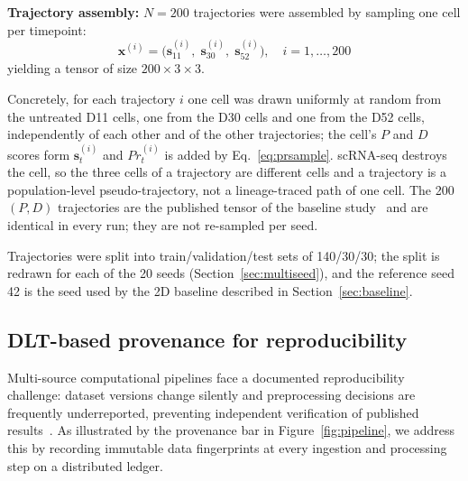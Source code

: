 \documentclass[5p,times,twocolumn]{elsarticle}
\newcommand{\rtag}[1]{}
\newcommand{\rev}[2]{\rtag{#1}#2}
\newenvironment{revblock}[1]{\par\rtag{#1}\ignorespaces}{\par}
\begin{document}
\textbf{Trajectory assembly:}
$N = 200$ trajectories were assembled by sampling one cell
per timepoint:
%
\begin{equation}
  \mathbf{x}^{(i)} =
    \bigl(\mathbf{s}^{(i)}_{11},\;
           \mathbf{s}^{(i)}_{30},\;
           \mathbf{s}^{(i)}_{52}\bigr),
  \quad i = 1,\ldots,200
  \label{eq:traj}
\end{equation}
%
yielding a tensor of size $200 \times 3 \times 3$.
\begin{revblock}{R1.2}
  Concretely, for each trajectory $i$ one cell was drawn
  uniformly at random from the untreated D11 cells, one from
  the D30 cells and one from the D52 cells, independently of
  each other and of the other trajectories; the cell's $P$ and
  $D$ scores form $\mathbf{s}^{(i)}_{t}$ and $Pr^{(i)}_{t}$ is
  added by Eq.~\eqref{eq:prsample}.
  scRNA-seq destroys the cell, so the three cells of a trajectory
  are different cells and a trajectory is a population-level
  pseudo-trajectory, not a lineage-traced path of one cell.
  The 200 $(P, D)$ trajectories are the published tensor of the
  baseline study~\cite{kanu2026transformer} and are identical in
  every run; they are not re-sampled per seed.
\end{revblock}
Trajectories were split into train/validation/test sets
of 140/30/30\rev{R1.4,R2.9}{; the split is redrawn for each of
  the 20 seeds (Section~\ref{sec:multiseed}), and the reference
  seed 42 is the seed used by} the 2D baseline described in
Section~\ref{sec:baseline}.

\subsection{\textbf{DLT-based provenance for reproducibility}}
\label{sec:dlt}

Multi-source computational pipelines face a documented
reproducibility challenge: dataset versions change silently
and preprocessing decisions are frequently underreported,
preventing independent verification of published
results~\cite{kanu2024blockchain}.
As illustrated by the provenance bar in
Figure~\ref{fig:pipeline}, we address this by recording
immutable data fingerprints at every ingestion and
processing step on a distributed ledger.
\end{document}
